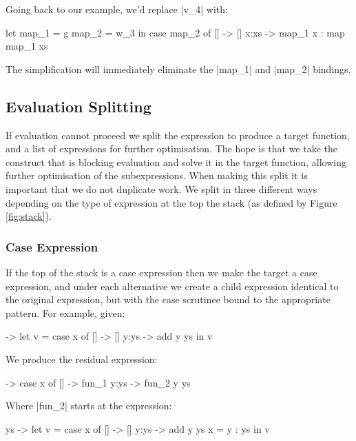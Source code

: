 \documentclass{sigplanconf}
\begin{document}
Going back to our example, we'd replace |v_4| with:

\begin{code}
let  map_1 = g
     map_2 = w_3
in   case  map_2 of
           [] -> []
           x:xs -> map_1 x : map map_1 xs
\end{code}

The simplification will immediately eliminate the |map_1| and |map_2| bindings.

\subsection{Evaluation Splitting}
\label{sec:eval_split}

If evaluation cannot proceed we split the expression to produce a target function, and a list of expressions for further optimisation. The hope is that we take the construct that is blocking evaluation and solve it in the target function, allowing further optimisation of the subexpressions. When making this split it is important that we do not duplicate work. We split in three different ways depending on the type of expression at the top the stack (as defined by Figure \ref{fig:stack}).

\subsubsection{Case Expression}

If the top of the stack is a case expression then we make the target a case expression, and under each alternative we create a child expression identical to the original expression, but with the case scrutinee bound to the appropriate pattern. For example, given:

\begin{code}
\x ->  let   v = case  x of
                       [] -> []
                       y:ys -> add y ys
       in    v
\end{code}

We produce the residual expression:

\begin{code}
\x -> case  x of
            [] -> fun_1
            y:ys -> fun_2 y ys
\end{code}

Where |fun_2| starts at the expression:

\begin{code}
\y ys ->  let  v = case  x of
                         [] -> []
                         y:ys -> add y ys
               x = y : ys
          in v
\end{code}
\end{document}
